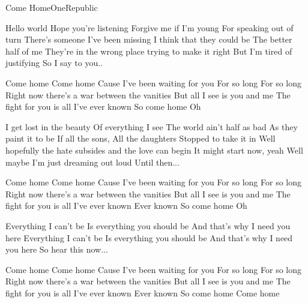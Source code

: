 \begin{Song}{Come Home}{OneRepublic}
\begin{multicols}{2}

\begin{Verse}
Hello world
Hope you're listening
Forgive me if I’m young
For speaking out of turn
There’s someone I’ve been missing
I think that they could be
The better half of me
They’re in the wrong place trying to make it right
But I’m tired of justifying
So I say to you..
\end{Verse}
\espaceInterStrophe

\begin{Chorus}
Come home
Come home
Cause I’ve been waiting for you
For so long
For so long
Right now there's a war between the vanities
But all I see is you and me
The fight for you is all I’ve ever known
So come home
Oh
\end{Chorus}
\espaceInterStrophe

\begin{Verse}
I get lost in the beauty
Of everything I see
The world ain’t half as bad
As they paint it to be
If all the sons,
All the daughters
Stopped to take it in
Well hopefully the hate subsides and the love can begin
It might start now, yeah
Well maybe I’m just dreaming out loud
Until then...
\end{Verse}
\espaceInterStrophe

\begin{Chorus}
Come home
Come home
Cause I’ve been waiting for you
For so long
For so long
Right now there's a war between the vanities
But all I see is you and me
The fight for you is all I’ve ever known
Ever known
So come home
Oh
\end{Chorus}
\espaceInterStrophe

\begin{Bridge}
Everything I can’t be
Is everything you should be
And that’s why I need you here
Everything I can’t be
Is everything you should be
And that’s why I need you here
So hear this now...
\end{Bridge}
\espaceInterStrophe

\begin{Chorus}
Come home
Come home
Cause I’ve been waiting for you
For so long
For so long
Right now there's a war between the vanities
But all I see is you and me
The fight for you is all I’ve ever known
Ever known
So come home
Come home
\end{Chorus}

\end{multicols}


\end{Song}
